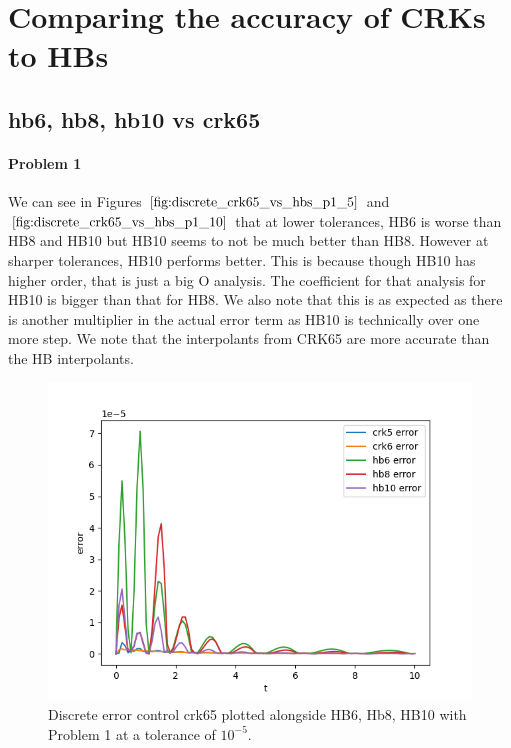 \section{Comparing the accuracy of CRKs to HBs}
\label{section:crks_vs_hbs}

\subsection{hb6, hb8, hb10 vs crk65}

\paragraph{Problem 1} We can see in Figures $\ref{fig:discrete_crk65_vs_hbs_p1_5}$ and $\ref{fig:discrete_crk65_vs_hbs_p1_10}$ that at lower tolerances, HB6 is worse than HB8 and HB10 but HB10 seems to not be much better than HB8. However at sharper tolerances, HB10 performs better. This is because though HB10 has higher order, that is just a big O analysis. The coefficient for that analysis for HB10 is bigger than that for HB8. We also note that this is as expected as there is another multiplier in the actual error term as HB10 is technically over one more step. We note that the interpolants from CRK65 are more accurate than the HB interpolants.

\begin{figure}[H]
\centering
\includegraphics[width=0.7\linewidth]{./figures/discrete_crk65_vs_hbs_p1_5}
\caption{Discrete error control crk65 plotted alongside HB6, Hb8, HB10 with Problem 1 at a tolerance of $10^{-5}$.}
\label{fig:discrete_crk65_vs_hbs_p1_5}
\end{figure}

